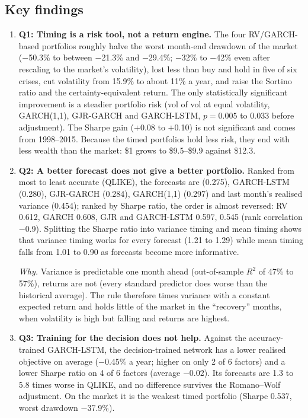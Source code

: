 \documentclass[12pt]{article}
\begin{document}
\subsection{Key findings}
\begin{enumerate}
\item \textbf{Q1: Timing is a risk tool, not a return engine.} The four RV/GARCH-based portfolios roughly halve the worst month-end drawdown of the market ($-$50.3\% to between $-$21.3\% and $-$29.4\%; $-$32\% to $-$42\% even after rescaling to the market's volatility), lost less than buy and hold in five of six crises, cut volatility from 15.9\% to about 11\% a year, and raise the Sortino ratio and the certainty-equivalent return. The only statistically significant improvement is a steadier portfolio risk (vol of vol at equal volatility, GARCH(1,1), GJR-GARCH and GARCH-LSTM, $p=0.005$ to $0.033$ before adjustment). The Sharpe gain ($+$0.08 to $+$0.10) is not significant and comes from 1998--2015. Because the timed portfolios hold less risk, they end with less wealth than the market: \$1 grows to \$9.5--\$9.9 against \$12.3.
\item \textbf{Q2: A better forecast does not give a better portfolio.} Ranked from most to least accurate (QLIKE), the forecasts are \VIX{} (0.275), GARCH-LSTM (0.280), GJR-GARCH (0.284), GARCH(1,1) (0.297) and last month's realised variance (0.454); ranked by Sharpe ratio, the order is almost reversed: RV 0.612, GARCH 0.608, GJR and GARCH-LSTM 0.597, \VIX{} 0.545 (rank correlation $-$0.9). Splitting the Sharpe ratio into variance timing and mean timing shows that variance timing works for every forecast (1.21 to 1.29) while mean timing falls from 1.01 to 0.90 as forecasts become more informative.

\textit{Why.} Variance is predictable one month ahead (out-of-sample $R^2$ of 47\% to 57\%), returns are not (every standard predictor does worse than the historical average). The rule therefore times variance with a constant expected return and holds little of the market in the ``recovery'' months, when volatility is high but falling and returns are highest.
\item \textbf{Q3: Training for the decision does not help.} Against the accuracy-trained GARCH-LSTM, the decision-trained network has a lower realised objective on average ($-$0.45\% a year; higher on only 2 of 6 factors) and a lower Sharpe ratio on 4 of 6 factors (average $-$0.02). Its forecasts are 1.3 to 5.8 times worse in QLIKE, and no difference survives the Romano--Wolf adjustment. On the market it is the weakest timed portfolio (Sharpe 0.537, worst drawdown $-$37.9\%).
\end{enumerate}
\end{document}
